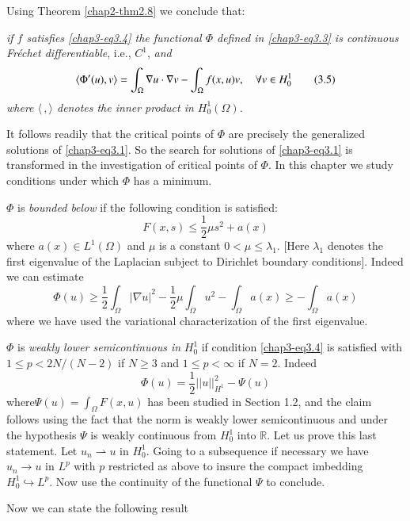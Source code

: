 Using Theorem \ref{chap2-thm2.8} we conclude that:

{\em if $f$ satisfies \eqref{chap3-eq3.4} the functional $\Phi$
  defined in \eqref{chap3-eq3.3} is continuous Fr\'echet
  differentiable}, i.e., $C^{1}$, {\em and}
\begin{equation*}
\langle \Phi'(u),v\rangle =\int_{\Omega}\nabla u\cdot \nabla
v-\int_{\Omega}f(x,u)v,\quad \forall v\in
H^{1}_{0}\tag{3.5}\label{chap3-eq3.5} 
\end{equation*}
{\em where $\langle\,, \rangle$ denotes the inner product in
  $H^{1}_{0}(\Omega)$.}

It follows readily that the critical points of $\Phi$ are precisely
the generalized solutions of \eqref{chap3-eq3.1}. So the search for
solutions of \eqref{chap3-eq3.1} is transformed in the investigation
of critical points of $\Phi$. In this chapter we study conditions
under which $\Phi$ has a minimum.

$\Phi$ is {\em bounded below} if the following condition is satisfied:
\begin{equation*}
F(x,s)\leq \frac{1}{2}\mu s^{2}+a(x)\tag{3.6}\label{chap3-eq3.6}
\end{equation*}
where $a(x)\in L^{1}(\Omega)$ and $\mu$ is a constant $0<\mu\leq
\lambda_{1}$. [Here $\lambda_{1}$ denotes the first eigenvalue of the
  Laplacian subject to Dirichlet boundary conditions]. Indeed we can
estimate
$$
\Phi(u)\geq \frac{1}{2}\int_{\Omega}|\nabla u|^{2}-\frac{1}{2}\mu
\int_{\Omega}u^{2}-\int_{\Omega}a(x)\geq -\int_{\Omega}a(x)
$$
where we have used the variational characterization of the first
eigenvalue. 

$\Phi$ is {\em weakly lower semicontinuous in} $H^{1}_{0}$ if
condition \eqref{chap3-eq3.4} is satisfied with $1\leq p<2N/(N-2)$ if
$N\geq 3$ and $1\leq p<\infty$ if $N=2$. Indeed
$$
\Phi(u)=\frac{1}{2}||u||^{2}_{H^{1}}-\Psi(u)
$$
where\pageoriginale $\Psi(u)=\int_{\Omega}F(x,u)$ has been studied in
Section 1.2, and the claim follows using the fact that
the norm is weakly lower semicontinuous and under the hypothesis
$\Psi$ is weakly continuous from $H^{1}_{0}$ into $\mathbb{R}$. Let us
prove this last statement. Let $u_{n}\rightharpoonup u$ in
$H^{1}_{0}$. Going to a subsequence if necessary we have $u_{n}\to u$
in $L^{p}$ with $p$ restricted as above to insure the compact
imbedding $H^{1}_{0}\hookrightarrow L^{p}$. Now use the continuity of
the functional $\Psi$ to conclude.

Now we can state the following result

